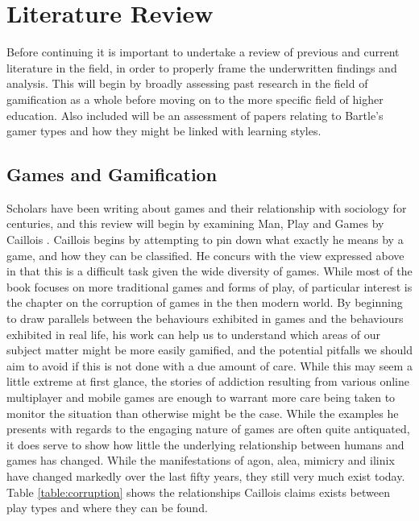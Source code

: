 \documentclass[12pt]{article}
\begin{document}
\section{Literature Review}
Before continuing it is important to undertake a review of previous and current literature in the field, in order to properly frame the underwritten findings and analysis. This will begin by broadly assessing past research in the field of gamification as a whole before moving on to the more specific field of higher education. Also included will be an assessment of papers relating to Bartle's gamer types and how they might be linked with learning styles.

\subsection{Games and Gamification}
Scholars have been writing about games and their relationship with sociology for centuries, and this review will begin by examining Man, Play and Games by Caillois \cite{caillois1961man}. Caillois begins by attempting to pin down what exactly he means by a game, and how they can be classified. He concurs with the view expressed above in that this is a difficult task given the wide diversity of games. While most of the book focuses on more traditional games and forms of play, of particular interest is the chapter on the corruption of games in the then modern world. By beginning to draw parallels between the behaviours exhibited in games and the behaviours exhibited in real life, his work can help us to understand which areas of our subject matter might be more easily gamified, and the potential pitfalls we should aim to avoid if this is not done with a due amount of care. While this may seem a little extreme at first glance, the stories of addiction resulting from various online multiplayer and mobile games are enough to warrant more care being taken to monitor the situation than otherwise might be the case. While the examples he presents with regards to the engaging nature of games are often quite antiquated, it does serve to show how little the underlying relationship between humans and games has changed. While the manifestations of agon, alea, mimicry and ilinix have changed markedly over the last fifty years, they still very much exist today. Table \ref{table:corruption} shows the relationships Caillois claims exists between play types and where they can be found.
\end{document}
